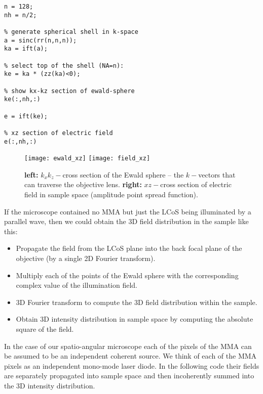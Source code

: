 {\small
\begin{verbatim}
n = 128;
nh = n/2;

% generate spherical shell in k-space
a = sinc(rr(n,n,n));
ka = ift(a);

% select top of the shell (NA=n):
ke = ka * (zz(ka)<0);

% show kx-kz section of ewald-sphere
ke(:,nh,:)

e = ift(ke);

% xz section of electric field
e(:,nh,:)
\end{verbatim}

\begin{figure}[!hbt]
  \centering
  \texttt{[image: ewald\_xz]}
  \quad\quad
  \texttt{[image: field\_xz]}
  \caption{{\bf left:} $k_xk_z-$cross section of the Ewald sphere --
    the $k-$vectors that can traverse the objective lens. {\bf right:}
    $xz-$cross section of electric field in sample space (amplitude
    point spread function).}
  \label{fig:simple-apsf}
\end{figure}

If the microscope contained no MMA but just the LCoS being illuminated
by a parallel wave, then we could obtain the 3D field distribution in the sample like this:
\begin{itemize}
\item Propagate the field from the LCoS plane into the back focal
  plane of the objective (by a single 2D Fourier transform).
\item Multiply each of the points of the Ewald sphere with the
  corresponding complex value of the illumination field.
\item 3D Fourier transform to compute the 3D field distribution within
  the sample.
\item Obtain 3D intensity distribution in sample space by computing
  the absolute square of the field.
\end{itemize}

In the case of our spatio-angular microscope each of the pixels of the
MMA can be assumed to be an independent coherent source. We think of
each of the MMA pixels as an independent mono-mode laser diode. In the
following code their fields are separately propagated into sample
space and then incoherently summed into the 3D intensity distribution.

}
